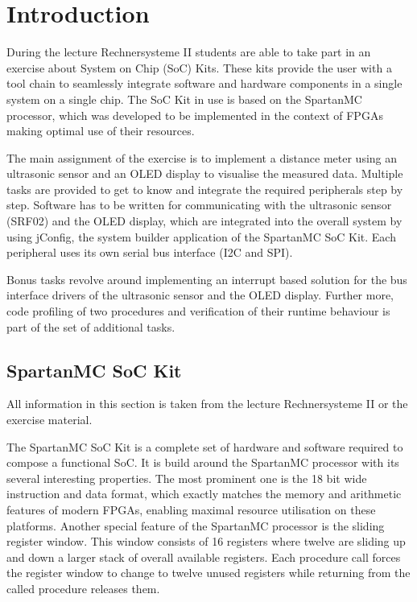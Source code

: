 \chapter{Introduction}
\label{cha:intro}
	During the lecture Rechnersysteme II students are able to take part in an exercise about System on Chip (SoC) Kits. These kits provide the user with a tool chain to seamlessly integrate software and hardware components in a single system on a single chip. The SoC Kit in use is based on the SpartanMC processor, which was developed to be implemented in the context of FPGAs making optimal use of their resources.

	The main assignment of the exercise is to implement a distance meter using an ultrasonic sensor and an OLED display to visualise the measured data. Multiple tasks are provided to get to know and integrate the required peripherals step by step. Software has to be written for communicating with the ultrasonic sensor (SRF02) and the OLED display, which are integrated into the overall system by using jConfig, the system builder application of the SpartanMC SoC Kit. Each peripheral uses its own serial bus interface (I2C and SPI).

	Bonus tasks revolve around implementing an interrupt based solution for the bus interface drivers of the ultrasonic sensor and the OLED display. Further more, code profiling of two procedures and verification of their runtime behaviour is part of the set of additional tasks.

	\section{SpartanMC SoC Kit} %
	\label{sec:spartanmc}
		All information in this section is taken from the lecture Rechnersysteme II or the exercise material.

		The SpartanMC SoC Kit is a complete set of hardware and software required to compose a functional SoC. It is build around the SpartanMC processor with its several interesting properties. The most prominent one is the 18 bit wide instruction and data format, which exactly matches the memory and arithmetic features of modern FPGAs, enabling maximal resource utilisation on these platforms. Another special feature of the SpartanMC processor is the sliding register window. This window consists of 16 registers where twelve are sliding up and down a larger stack of overall available registers. Each procedure call forces the register window to change to twelve unused registers while returning from the called procedure releases them.

